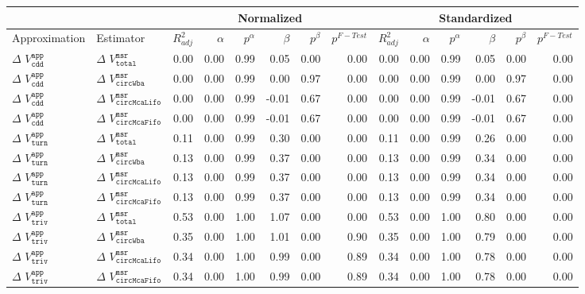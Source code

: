 \begin{tabular}{llrrrrrrrrrrrr}
   \hline \multicolumn{2}{l}{ } & \multicolumn{6}{c}{Normalized} & \multicolumn{6}{c}{Standardized} \\ \hline
Approximation & Estimator & $R^{2}_{adj}$ & $\alpha$ & $p^{\alpha}$ & $\beta$ & $p^{\beta}$ & $p^{F-Test}$ & $R^{2}_{adj}$ & $\alpha$ & $p^{\alpha}$ & $\beta$ & $p^{\beta}$ & $p^{F-Test}$ \\ 
   \hline
$\Delta$ $V^{\mathtt{app}}_{\mathtt{cdd}}$ & $\Delta$ $V^{\mathtt{msr}}_{\mathtt{total}}$ & 0.00 & 0.00 & 0.99 &  0.05 & 0.00 & 0.00 & 0.00 & 0.00 & 0.99 &  0.05 & 0.00 & 0.00 \\ 
  $\Delta$ $V^{\mathtt{app}}_{\mathtt{cdd}}$ & $\Delta$ $V^{\mathtt{msr}}_{\mathtt{circWba}}$ & 0.00 & 0.00 & 0.99 &  0.00 & 0.97 & 0.00 & 0.00 & 0.00 & 0.99 &  0.00 & 0.97 & 0.00 \\ 
  $\Delta$ $V^{\mathtt{app}}_{\mathtt{cdd}}$ & $\Delta$ $V^{\mathtt{msr}}_{\mathtt{circMcaLifo}}$ & 0.00 & 0.00 & 0.99 & -0.01 & 0.67 & 0.00 & 0.00 & 0.00 & 0.99 & -0.01 & 0.67 & 0.00 \\ 
  $\Delta$ $V^{\mathtt{app}}_{\mathtt{cdd}}$ & $\Delta$ $V^{\mathtt{msr}}_{\mathtt{circMcaFifo}}$ & 0.00 & 0.00 & 0.99 & -0.01 & 0.67 & 0.00 & 0.00 & 0.00 & 0.99 & -0.01 & 0.67 & 0.00 \\ 
   \hline
$\Delta$ $V^{\mathtt{app}}_{\mathtt{turn}}$ & $\Delta$ $V^{\mathtt{msr}}_{\mathtt{total}}$ & 0.11 & 0.00 & 0.99 &  0.30 & 0.00 & 0.00 & 0.11 & 0.00 & 0.99 &  0.26 & 0.00 & 0.00 \\ 
  $\Delta$ $V^{\mathtt{app}}_{\mathtt{turn}}$ & $\Delta$ $V^{\mathtt{msr}}_{\mathtt{circWba}}$ & 0.13 & 0.00 & 0.99 &  0.37 & 0.00 & 0.00 & 0.13 & 0.00 & 0.99 &  0.34 & 0.00 & 0.00 \\ 
  $\Delta$ $V^{\mathtt{app}}_{\mathtt{turn}}$ & $\Delta$ $V^{\mathtt{msr}}_{\mathtt{circMcaLifo}}$ & 0.13 & 0.00 & 0.99 &  0.37 & 0.00 & 0.00 & 0.13 & 0.00 & 0.99 &  0.34 & 0.00 & 0.00 \\ 
  $\Delta$ $V^{\mathtt{app}}_{\mathtt{turn}}$ & $\Delta$ $V^{\mathtt{msr}}_{\mathtt{circMcaFifo}}$ & 0.13 & 0.00 & 0.99 &  0.37 & 0.00 & 0.00 & 0.13 & 0.00 & 0.99 &  0.34 & 0.00 & 0.00 \\ 
   \hline
$\Delta$ $V^{\mathtt{app}}_{\mathtt{triv}}$ & $\Delta$ $V^{\mathtt{msr}}_{\mathtt{total}}$ & 0.53 & 0.00 & 1.00 &  1.07 & 0.00 & 0.00 & 0.53 & 0.00 & 1.00 &  0.80 & 0.00 & 0.00 \\ 
  $\Delta$ $V^{\mathtt{app}}_{\mathtt{triv}}$ & $\Delta$ $V^{\mathtt{msr}}_{\mathtt{circWba}}$ & 0.35 & 0.00 & 1.00 &  1.01 & 0.00 & 0.90 & 0.35 & 0.00 & 1.00 &  0.79 & 0.00 & 0.00 \\ 
  $\Delta$ $V^{\mathtt{app}}_{\mathtt{triv}}$ & $\Delta$ $V^{\mathtt{msr}}_{\mathtt{circMcaLifo}}$ & 0.34 & 0.00 & 1.00 &  0.99 & 0.00 & 0.89 & 0.34 & 0.00 & 1.00 &  0.78 & 0.00 & 0.00 \\ 
  $\Delta$ $V^{\mathtt{app}}_{\mathtt{triv}}$ & $\Delta$ $V^{\mathtt{msr}}_{\mathtt{circMcaFifo}}$ & 0.34 & 0.00 & 1.00 &  0.99 & 0.00 & 0.89 & 0.34 & 0.00 & 1.00 &  0.78 & 0.00 & 0.00 \\ 
   \hline
\end{tabular}

